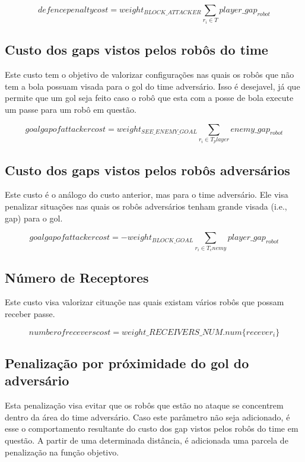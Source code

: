 \begin{dmath}
  defence penalty cost = weight_{BLOCK{\_}ATTACKER}
   \sum_{r_i \in T} player{\_}gap_{robot}
\end{dmath}

\subsection{Custo dos gaps vistos pelos robôs do time}

Este custo tem o objetivo de valorizar configurações nas quais
os robôs que não tem a bola possuam visada para o gol do time
adversário. Isso
é desejavel, já que permite que um gol seja feito caso o robô
que esta com a posse de bola execute um passe para um robô
em questão.

\begin{dmath}
   goal gap of attacker cost = weight_{SEE{\_}ENEMY{\_}GOAL}
    \sum_{r_i \in T_player} enemy{\_}gap_{robot}
\end{dmath}

\subsection{Custo dos gaps vistos pelos robôs adversários}

Este custo é o análogo do custo anterior, mas para o
time adversário. Ele visa penalizar situações nas quais
os robôs adversários tenham grande visada (i.e., gap)
para o gol. 

\begin{dmath}
   goal gap of attacker cost = - weight_{BLOCK{\_}GOAL}
    \sum_{r_i \in T_enemy} player{\_}gap_{robot}
\end{dmath}

\subsection{Número de Receptores}

Este custo visa valorizar cituaçõe nas quais existam
vários robôs que possam receber passe.

\begin{dmath}
  number of recevers cost = weight{\_}RECEIVERS{\_}NUM . 
   num \lbrace recever_i \rbrace
\end{dmath}

\subsection{Penalização por próximidade do gol do adversário}
Esta penalização visa evitar que os robôs que estão no ataque
se concentrem dentro da área do time adversário. Caso este
parâmetro não seja adicionado, é esse o comportamento resultante
do custo dos gap vistos pelos robôs do time em questão. 
A partir de uma determinada distância, é adicionada uma parcela
de penalização na função objetivo.

